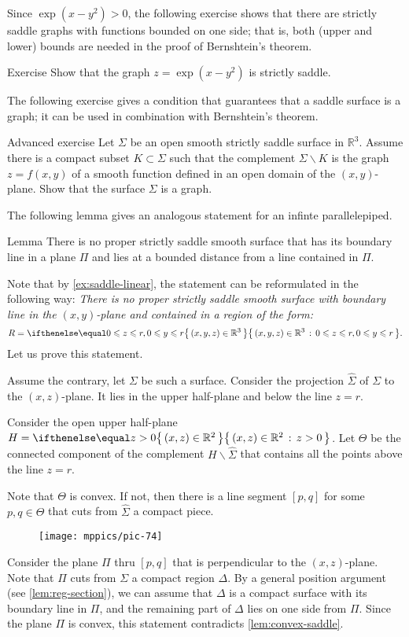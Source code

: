 Since $\exp(x-y^2)>0$,
the following exercise shows that there are strictly saddle graphs with functions bounded on one side;
that is, both (upper and lower) bounds are needed in the proof of Bernshtein's theorem.

\begin{thm}{Exercise}\label{ex:one-side-bernshtein}
Show that the graph
$z=\exp(x-y^2)$
is strictly saddle.
\end{thm}

The following exercise gives a condition that guarantees that a saddle surface is a graph;
it can be used in combination with Bernshtein's theorem.

\begin{thm}{Advanced exercise}\label{ex:saddle-graph}
Let $\Sigma$ be an open smooth strictly saddle surface in $\mathbb{R}^3$.
Assume there is a compact subset $K\subset \Sigma$ such that the complement $\Sigma\backslash K$ is the graph $z=f(x,y)$ of a smooth function defined in an open domain of the $(x,y)$-plane.
Show that the surface $\Sigma$ is a graph.
\end{thm}

The following lemma gives an analogous statement for an infinte parallelepiped.

\begin{thm}{Lemma}\label{lem:region}
There is no proper strictly saddle smooth surface that has its boundary line in a plane $\Pi$ 
and lies at a bounded distance from a line contained in $\Pi$.
\end{thm}


Note that by \ref{ex:saddle-linear}, the statement can be reformulated in the following way:
\textit{There is no proper strictly saddle smooth surface 
with  boundary line in the $(x,y)$-plane
and contained in a region of the form:}
\[R=\set{(x,y,z)\in\mathbb{R}^3}{0\le z\le r, 0\le y\le r}.\]
Let us prove this statement.

Assume the contrary, let $\Sigma$ be such a surface.
Consider the projection $\hat \Sigma$ of $\Sigma$ to the $(x,z)$-plane.
It lies in the upper half-plane and below the line $z=r$.

Consider the open upper half-plane $H=\set{(x,z)\in \mathbb{R}^2}{z> 0}$. 
Let $\Theta$ be the connected component of the complement $H\backslash \hat \Sigma$ that contains all the points above the line $z=r$.

Note that $\Theta$ is convex.
If not, then there is a line segment $[p,q]$ for some $p,q\in \Theta$ that cuts from $\hat\Sigma$ a compact piece.
\begin{figure}[!ht]
\vskip-0mm
\centering
\texttt{[image: mppics/pic-74]}
\vskip0mm
\end{figure}
Consider the plane $\Pi$ thru $[p,q]$ that is perpendicular to the $(x,z)$-plane.
Note that $\Pi$ cuts from $\Sigma$ a compact region $\Delta$.
By a general position argument (see \ref{lem:reg-section}),
we can assume that $\Delta$ is a compact surface with its boundary line in $\Pi$, and the remaining part of $\Delta$ lies on one side from $\Pi$.
Since the plane $\Pi$ is convex, this statement contradicts \ref{lem:convex-saddle}.

